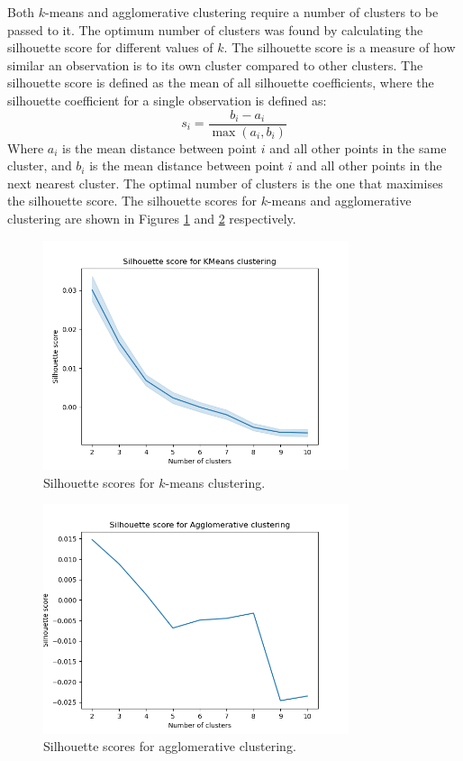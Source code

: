 \documentclass{article}
\begin{document}
\begin{enumerate}[label=\alph*)]
    Both $k$-means and agglomerative clustering require a number of clusters to be passed to it. The optimum number of clusters was found by calculating the silhouette score for different values of $k$. The silhouette score is a measure of how similar an observation is to its own cluster compared to other clusters. The silhouette score is defined as the mean of all silhouette coefficients, where the silhouette coefficient for a single observation is defined as:
    \begin{equation*}
        s_i=\frac{b_i-a_i}{\max(a_i,b_i)}
    \end{equation*}
    Where $a_i$ is the mean distance between point $i$ and all other points in the same cluster, and $b_i$ is the mean distance between point $i$ and all other points in the next nearest cluster. The optimal number of clusters is the one that maximises the silhouette score. The silhouette scores for $k$-means and agglomerative clustering are shown in Figures \ref{fig:Q5a_silhouette_scores} and \ref{fig:Q5a_silhouette_scores_agg} respectively.
    \begin{figure}[!htb]
        \centering
        \includegraphics[width=0.8\textwidth]{Q5a_KMeans_silhouette.png}
        \caption{Silhouette scores for $k$-means clustering.}
        \label{fig:Q5a_silhouette_scores}
    \end{figure}
    \begin{figure}[!htb]
        \centering
        \includegraphics[width=0.8\textwidth]{Q5a_Agglomerative_silhouette.png}
        \caption{Silhouette scores for agglomerative clustering.}
        \label{fig:Q5a_silhouette_scores_agg}
    \end{figure}


\end{enumerate}
\end{document}
